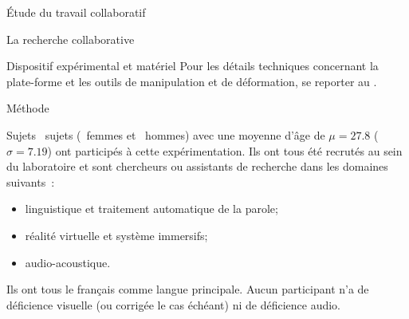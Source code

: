 \documentclass[myfrancais]{mythesis}
\begin{document}
\begin{mypart}{Étude du travail collaboratif}
\begin{mychapter}{La recherche collaborative}
\begin{mysection}{Dispositif expérimental et matériel}
				Pour les détails techniques concernant la plate-forme et les outils de manipulation et de déformation, se reporter au .
			\end{mysection}
			\begin{mysection}{Méthode}
				\begin{mysubsection}[sse-exp1-Sujets]{Sujets}
					~sujets (~femmes et ~hommes) avec une moyenne d'âge de $\mu = 27.8$ ($\sigma = 7.19$) ont participés à cette expérimentation.
					Ils ont tous été recrutés au sein du laboratoire  et sont chercheurs ou assistants de recherche dans les domaines suivants~:
					\begin{itemize}
						\item linguistique et traitement automatique de la parole;
						\item réalité virtuelle et système immersifs;
						\item audio-acoustique.
					\end{itemize}
					Ils ont tous le français comme langue principale.
					Aucun participant n'a de déficience visuelle (ou corrigée le cas échéant) ni de déficience audio.


\end{mysubsection}
\end{mysection}
\end{mychapter}
\end{mypart}
\end{document}
